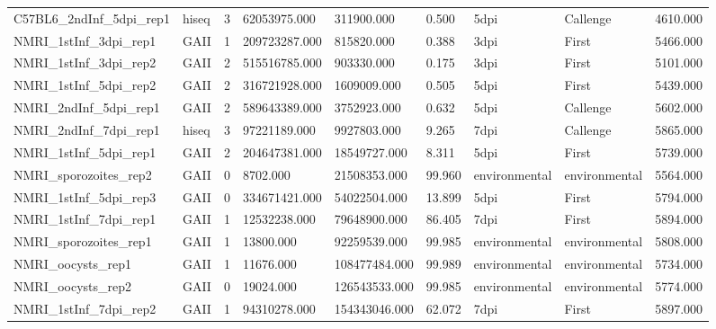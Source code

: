 \begin{table}[ht]
\begin{tabular}{lllllllll}
  C57BL6\_2ndInf\_5dpi\_rep1 & hiseq & 3 & 62053975.000 & 311900.000 & 0.500 & 5dpi & Callenge & 4610.000 \\ 
  NMRI\_1stInf\_3dpi\_rep1 & GAII & 1 & 209723287.000 & 815820.000 & 0.388 & 3dpi & First & 5466.000 \\ 
  NMRI\_1stInf\_3dpi\_rep2 & GAII & 2 & 515516785.000 & 903330.000 & 0.175 & 3dpi & First & 5101.000 \\ 
  NMRI\_1stInf\_5dpi\_rep2 & GAII & 2 & 316721928.000 & 1609009.000 & 0.505 & 5dpi & First & 5439.000 \\ 
  NMRI\_2ndInf\_5dpi\_rep1 & GAII & 2 & 589643389.000 & 3752923.000 & 0.632 & 5dpi & Callenge & 5602.000 \\ 
  NMRI\_2ndInf\_7dpi\_rep1 & hiseq & 3 & 97221189.000 & 9927803.000 & 9.265 & 7dpi & Callenge & 5865.000 \\ 
  NMRI\_1stInf\_5dpi\_rep1 & GAII & 2 & 204647381.000 & 18549727.000 & 8.311 & 5dpi & First & 5739.000 \\ 
  NMRI\_sporozoites\_rep2 & GAII & 0 & 8702.000 & 21508353.000 & 99.960 & environmental & environmental & 5564.000 \\ 
  NMRI\_1stInf\_5dpi\_rep3 & GAII & 0 & 334671421.000 & 54022504.000 & 13.899 & 5dpi & First & 5794.000 \\ 
  NMRI\_1stInf\_7dpi\_rep1 & GAII & 1 & 12532238.000 & 79648900.000 & 86.405 & 7dpi & First & 5894.000 \\ 
  NMRI\_sporozoites\_rep1 & GAII & 1 & 13800.000 & 92259539.000 & 99.985 & environmental & environmental & 5808.000 \\ 
  NMRI\_oocysts\_rep1 & GAII & 1 & 11676.000 & 108477484.000 & 99.989 & environmental & environmental & 5734.000 \\ 
  NMRI\_oocysts\_rep2 & GAII & 0 & 19024.000 & 126543533.000 & 99.985 & environmental & environmental & 5774.000 \\ 
  NMRI\_1stInf\_7dpi\_rep2 & GAII & 1 & 94310278.000 & 154343046.000 & 62.072 & 7dpi & First & 5897.000 \\ 
   \hline
\end{tabular}
\end{table}
